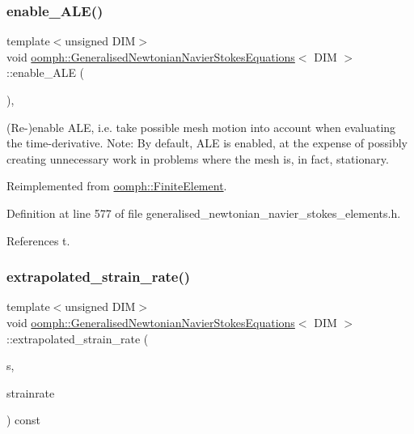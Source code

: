 \subsubsection{\texorpdfstring{enable\+\_\+\+A\+L\+E()}{enable\_ALE()}}
{\footnotesize\ttfamily template$<$unsigned D\+IM$>$ \\
void \hyperlink{classoomph_1_1GeneralisedNewtonianNavierStokesEquations}{oomph\+::\+Generalised\+Newtonian\+Navier\+Stokes\+Equations}$<$ D\+IM $>$\+::enable\+\_\+\+A\+LE (\begin{DoxyParamCaption}{ }\end{DoxyParamCaption})\hspace{0.3cm}{\ttfamily [inline]}, {\ttfamily [virtual]}}



(Re-\/)enable A\+LE, i.\+e. take possible mesh motion into account when evaluating the time-\/derivative. Note\+: By default, A\+LE is enabled, at the expense of possibly creating unnecessary work in problems where the mesh is, in fact, stationary. 



Reimplemented from \hyperlink{classoomph_1_1FiniteElement_a92ef8967fa4e2d6c33c51ea3efa3aa82}{oomph\+::\+Finite\+Element}.



Definition at line 577 of file generalised\+\_\+newtonian\+\_\+navier\+\_\+stokes\+\_\+elements.\+h.



References t.

\mbox{\label{classoomph_1_1GeneralisedNewtonianNavierStokesEquations_a33b963729db69fa1e4054168b3a15ccb}} 
\subsubsection{\texorpdfstring{extrapolated\+\_\+strain\+\_\+rate()}{extrapolated\_strain\_rate()}\hspace{0.1cm}{\footnotesize\ttfamily [1/2]}}
{\footnotesize\ttfamily template$<$unsigned D\+IM$>$ \\
void \hyperlink{classoomph_1_1GeneralisedNewtonianNavierStokesEquations}{oomph\+::\+Generalised\+Newtonian\+Navier\+Stokes\+Equations}$<$ D\+IM $>$\+::extrapolated\+\_\+strain\+\_\+rate (\begin{DoxyParamCaption}\item[{const \hyperlink{classoomph_1_1Vector}{Vector}$<$ double $>$ \&}]{s,  }\item[{\hyperlink{classoomph_1_1DenseMatrix}{Dense\+Matrix}$<$ double $>$ \&}]{strainrate }\end{DoxyParamCaption}) const\hspace{0.3cm}{\ttfamily [virtual]}}




